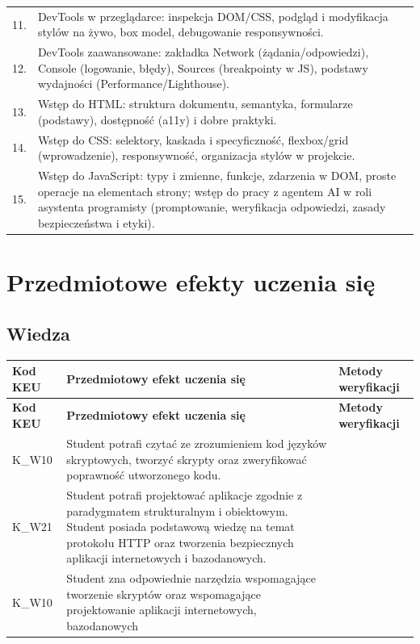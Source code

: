 \documentclass[12pt, a4paper]{article}
\newcommand{\thdrule}{\noalign{\global\setlength{\extrarowheight}{0pt}}}
\newcommand{\thdend}{\noalign{\global\setlength{\extrarowheight}{3pt}}}
\begin{document}
{\begin{longtable}{m{1.5cm}m{14.5cm}}
  \rowcolor{tableRowLight} 11. &  DevTools w przeglądarce: inspekcja DOM/CSS, podgląd i modyfikacja stylów na żywo, box model, debugowanie responsywności. \\
  \rowcolor{tableRowAlt} 12. &  DevTools zaawansowane: zakładka Network (żądania/odpowiedzi), Console (logowanie, błędy), Sources (breakpointy w JS), podstawy wydajności (Performance/Lighthouse). \\
  \rowcolor{tableRowLight} 13. &  Wstęp do HTML: struktura dokumentu, semantyka, formularze (podstawy), dostępność (a11y) i dobre praktyki. \\
  \rowcolor{tableRowAlt} 14. &  Wstęp do CSS: selektory, kaskada i specyficzność, flexbox/grid (wprowadzenie), responsywność, organizacja stylów w projekcie. \\
  \rowcolor{tableRowLight} 15. &  Wstęp do JavaScript: typy i zmienne, funkcje, zdarzenia w DOM, proste operacje na elementach strony; wstęp do pracy z agentem AI w roli asystenta programisty (promptowanie, weryfikacja odpowiedzi, zasady bezpieczeństwa i etyki). \\
\bottomrule
\end{longtable}}

\section{Przedmiotowe efekty uczenia się}

\subsection*{Wiedza}
{\scriptsize
\begin{longtable}{m{1.6cm}m{9.0cm}m{4.2cm}}
\thdrule\toprule
\rowcolor{pjatkRed} {\color{white}\footnotesize\textbf{\vphantom{Ag}Kod KEU}} & {\color{white}\footnotesize\textbf{\vphantom{Ag}Przedmiotowy efekt uczenia się}} & {\color{white}\footnotesize\textbf{\vphantom{Ag}Metody weryfikacji}} \\
\midrule\thdend
\endfirsthead
\thdrule\toprule
\rowcolor{pjatkRed} {\color{white}\footnotesize\textbf{\vphantom{Ag}Kod KEU}} & {\color{white}\footnotesize\textbf{\vphantom{Ag}Przedmiotowy efekt uczenia się}} & {\color{white}\footnotesize\textbf{\vphantom{Ag}Metody weryfikacji}} \\
\midrule\thdend
\endhead
  \rowcolor{tableRowLight} K\_W10 & Student potrafi  czytać ze zrozumieniem kod języków skryptowych,  tworzyć skrypty  oraz zweryfikować poprawność utworzonego kodu. &  \\
  \rowcolor{tableRowAlt} K\_W21 & Student potrafi projektować aplikacje  zgodnie z paradygmatem strukturalnym i obiektowym. Student posiada podstawową wiedzę na temat protokołu HTTP oraz tworzenia bezpiecznych aplikacji internetowych i bazodanowych. &  \\
  \rowcolor{tableRowLight} K\_W10 & Student zna odpowiednie narzędzia wspomagające tworzenie skryptów oraz wspomagające projektowanie aplikacji internetowych, bazodanowych &  \\
\bottomrule
\end{longtable}}
\end{document}
